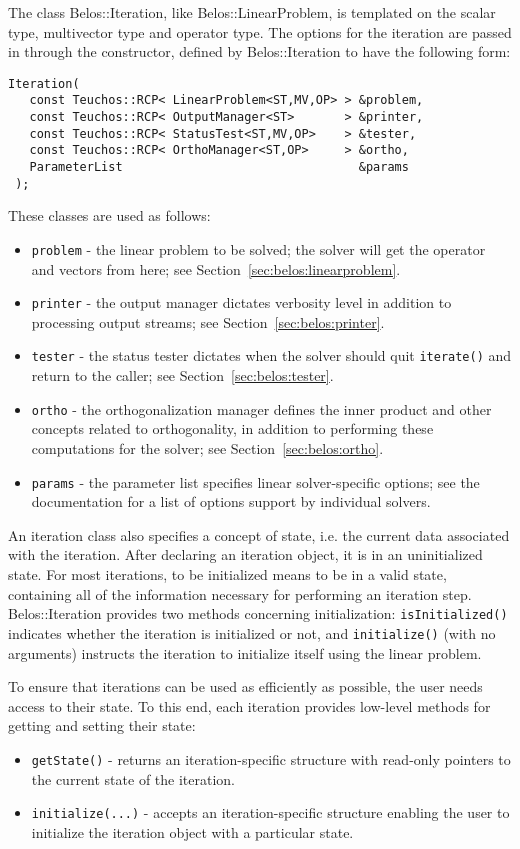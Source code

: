 The class Belos::Iteration, like Belos::LinearProblem, is templated on the scalar
type, multivector type and operator type. The options for the iteration are passed in
through the constructor, defined by Belos::Iteration to have the following form:
\begin{verbatim}
Iteration( 
   const Teuchos::RCP< LinearProblem<ST,MV,OP> > &problem, 
   const Teuchos::RCP< OutputManager<ST>       > &printer,
   const Teuchos::RCP< StatusTest<ST,MV,OP>    > &tester,
   const Teuchos::RCP< OrthoManager<ST,OP>     > &ortho,
   ParameterList                                 &params  
 );
\end{verbatim}

These classes are used as follows:
\begin{itemize}
  \item \verb!problem! - the linear problem to be solved; the solver will
    get the operator and vectors from here; see Section~\ref{sec:belos:linearproblem}.
  \item \verb!printer! - the output manager dictates verbosity level in addition to 
    processing output streams; see Section~\ref{sec:belos:printer}.
  \item \verb!tester! - the status tester dictates when the solver should quit
    \verb!iterate()! and return to the caller; see Section~\ref{sec:belos:tester}.
  \item \verb!ortho! - the orthogonalization manager defines the inner product and other
    concepts related to orthogonality, in addition to performing these computations for 
    the solver; see Section~\ref{sec:belos:ortho}.
  \item \verb!params! - the parameter list specifies linear solver-specific options; see the
    documentation for a list of options support by individual solvers.
\end{itemize}

An iteration class also specifies a concept of state,
i.e. the current data associated with the iteration. After declaring an iteration
object, it is in an uninitialized state. For most iterations, to be
initialized means to be in a valid state, containing all of the information necessary for
performing an iteration step. Belos::Iteration provides two methods concerning
initialization: \verb!isInitialized()! indicates whether the iteration is initialized or not,
and \verb!initialize()! (with no arguments) instructs the iteration to initialize itself
using the linear problem.

To ensure that iterations can be used as efficiently as possible, 
the user needs access to their state. To this end, each iteration provides 
low-level methods for getting and setting their
state:
\begin{itemize}
  \item \verb!getState()! - returns an iteration-specific structure with read-only pointers to
    the current state of the iteration.
  \item \verb!initialize(...)! - accepts an iteration-specific structure enabling the user to
    initialize the iteration object with a particular state.
\end{itemize}

